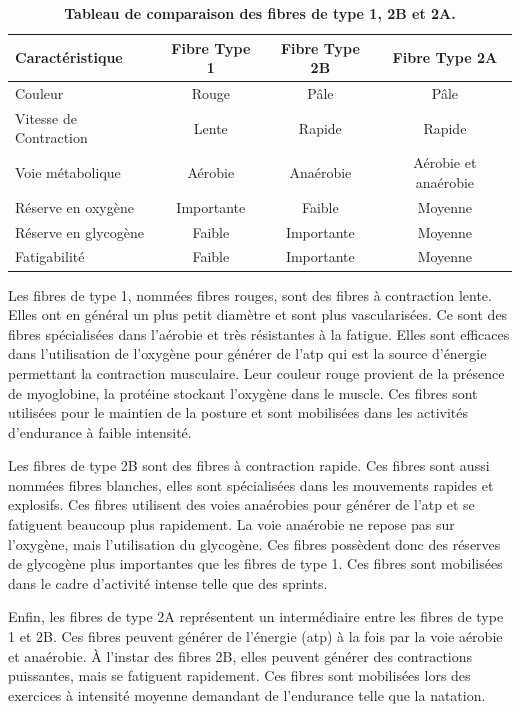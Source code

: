 \begin{table}[!ht]
\centering
\begin{tabular}{|l|c|c|c|} 
 \hline
 \textbf{Caractéristique} & \textbf{Fibre Type 1} & \textbf{Fibre Type 2B}  & \textbf{Fibre Type 2A} \\
 \hline
Couleur & Rouge & Pâle & Pâle \\
Vitesse de Contraction & Lente & Rapide & Rapide \\
Voie métabolique & Aérobie & Anaérobie & Aérobie et anaérobie \\
Réserve en oxygène & Importante & Faible & Moyenne \\
Réserve en glycogène & Faible & Importante & Moyenne \\
Fatigabilité & Faible & Importante & Moyenne \\
 \hline
\end{tabular}
\caption[Tableau de comparaison des fibres de type 1, 2B et 2A.]{\textbf{Tableau de comparaison des fibres de type 1, 2B et 2A.}}
\label{table:fiber-compare}
\end{table}

Les fibres de type 1, nommées fibres rouges, sont des fibres à contraction lente. Elles ont en général un plus petit diamètre et sont plus vascularisées. Ce sont des fibres spécialisées dans l'aérobie et très résistantes à la fatigue. Elles sont efficaces dans l'utilisation de l'oxygène pour générer de l'\gls{atp} qui est la source d'énergie permettant la contraction musculaire. Leur couleur rouge provient de la présence de myoglobine, la protéine stockant l'oxygène dans le muscle. Ces fibres sont utilisées pour le maintien de la posture et sont mobilisées dans les activités d'endurance à faible intensité.


Les fibres de type 2B sont des fibres à contraction rapide. Ces fibres sont aussi nommées fibres blanches, elles sont spécialisées dans les mouvements rapides et explosifs. Ces fibres utilisent des voies anaérobies pour générer de l'\gls{atp} et se fatiguent beaucoup plus rapidement. La voie anaérobie ne repose pas sur l'oxygène, mais l'utilisation du glycogène. Ces fibres possèdent donc des réserves de glycogène plus importantes que les fibres de type 1. Ces fibres sont mobilisées dans le cadre d'activité intense telle que des sprints.


Enfin, les fibres de type 2A représentent un intermédiaire entre les fibres de type 1 et 2B.  Ces fibres peuvent générer de l'énergie (\gls{atp}) à la fois par la voie aérobie et anaérobie. À l'instar des fibres 2B, elles peuvent générer des contractions puissantes, mais se fatiguent rapidement. Ces fibres sont mobilisées lors des exercices à intensité moyenne demandant de l'endurance telle que la natation.


